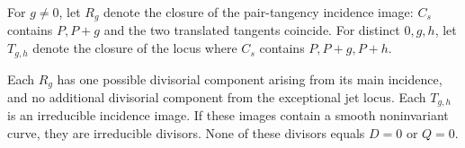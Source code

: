 For $g\ne0$, let $R_g$ denote the closure of the pair-tangency incidence
image: $C_s$ contains $P,P+g$ and the two translated tangents coincide.
For distinct $0,g,h$, let $T_{g,h}$ denote the closure of the locus
where $C_s$ contains $P,P+g,P+h$.

\begin{lemma}
\label{lem:ss-level3-collision-incidence}
Each $R_g$ has one possible divisorial component arising from its
main incidence, and no additional divisorial component from the
exceptional jet locus. Each $T_{g,h}$ is an irreducible incidence
image. If these images contain a smooth noninvariant curve, they
are irreducible divisors. None of these divisors equals $D=0$ or
$Q=0$.
\end{lemma}
